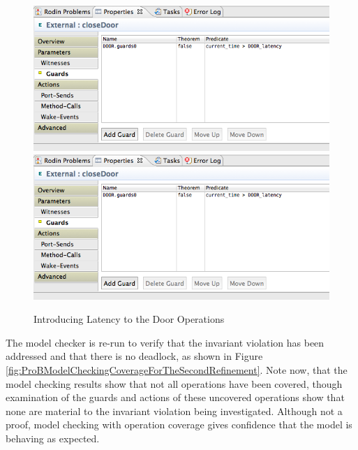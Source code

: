  \begin{figure}[!htbp]
  \centering
  \ifplastex
  \includegraphics[width=1024]{figures/image32.png}
  \else
  \includegraphics[width=1\textwidth]{figures/image32.png}
  \fi
  \caption{Introducing Latency to the Door Operations}
  \label{fig:IntroducingLatencyToTheDoorOperations}
\end{figure} 
 
The model checker is re-run to verify that the invariant violation has been addressed and that there is no deadlock, as shown in Figure \ref{fig:ProBModelCheckingCoverageForTheSecondRefinement}. Note now, that the model checking results show that not all operations have been covered, though examination of the guards and actions of these uncovered operations show that none are material to the invariant violation being investigated. Although not a proof, model checking with operation coverage gives confidence that the model is behaving as expected.
 
